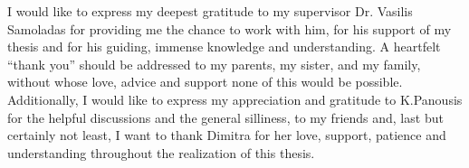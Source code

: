 \begin{acknowledgments}

I would like to express my deepest gratitude to my supervisor Dr. Vasilis Samoladas for providing me the chance to work with him, for his support of my thesis and for his guiding, immense knowledge and understanding. A heartfelt ``thank you'' should be addressed to my parents, my sister, and my family, without whose love, advice and support none of this would be possible. Additionally, I would like to express my appreciation and gratitude to K.Panousis for the helpful discussions and the general silliness, to my friends and, last but certainly not least, I want to thank Dimitra for her love, support, patience and understanding throughout the realization of this thesis. 

\end{acknowledgments}